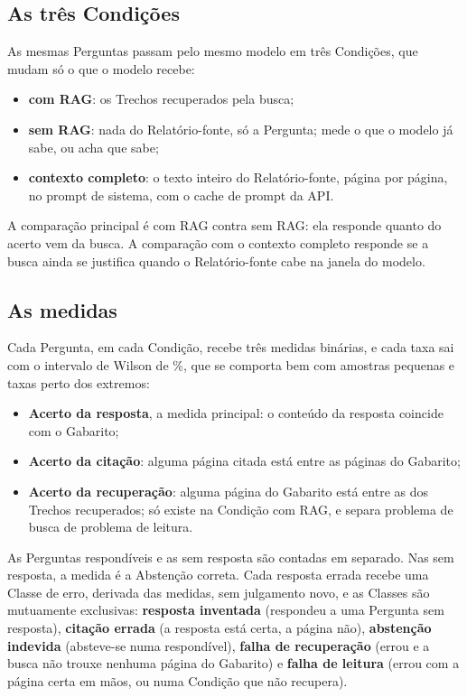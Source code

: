 \documentclass[11pt,a4paper]{article}
\begin{document}
\subsection{As três Condições}

As mesmas Perguntas passam pelo mesmo modelo em três Condições, que mudam
só o que o modelo recebe:

\begin{itemize}[leftmargin=*, itemsep=2pt]
  \item \textbf{com RAG}: os \NumParametrosK{} Trechos recuperados pela busca;
  \item \textbf{sem RAG}: nada do Relatório-fonte, só a Pergunta; mede o que o
    modelo já sabe, ou acha que sabe;
  \item \textbf{contexto completo}: o texto inteiro do Relatório-fonte, página
    por página, no prompt de sistema, com o cache de prompt da API.
\end{itemize}

A comparação principal é com RAG contra sem RAG: ela responde quanto do
acerto vem da busca. A comparação com o contexto completo responde se a
busca ainda se justifica quando o Relatório-fonte cabe na janela do modelo.

\subsection{As medidas}

Cada Pergunta, em cada Condição, recebe três medidas binárias, e cada taxa
sai com o intervalo de Wilson de \NumIcNivel\%, que se comporta bem com
amostras pequenas e taxas perto dos extremos:

\begin{itemize}[leftmargin=*, itemsep=2pt]
  \item \textbf{Acerto da resposta}, a medida principal: o conteúdo da
    resposta coincide com o Gabarito;
  \item \textbf{Acerto da citação}: alguma página citada está entre as
    páginas do Gabarito;
  \item \textbf{Acerto da recuperação}: alguma página do Gabarito está entre
    as dos Trechos recuperados; só existe na Condição com RAG, e separa
    problema de busca de problema de leitura.
\end{itemize}

As Perguntas respondíveis e as sem resposta são contadas em separado. Nas
sem resposta, a medida é a Abstenção correta. Cada resposta errada recebe
uma Classe de erro, derivada das medidas, sem julgamento novo, e as Classes
são mutuamente exclusivas: \textbf{resposta inventada} (respondeu a uma
Pergunta sem resposta), \textbf{citação errada} (a resposta está certa, a
página não), \textbf{abstenção indevida} (absteve-se numa respondível),
\textbf{falha de recuperação} (errou e a busca não trouxe nenhuma página do
Gabarito) e \textbf{falha de leitura} (errou com a página certa em mãos, ou
numa Condição que não recupera).
\end{document}
